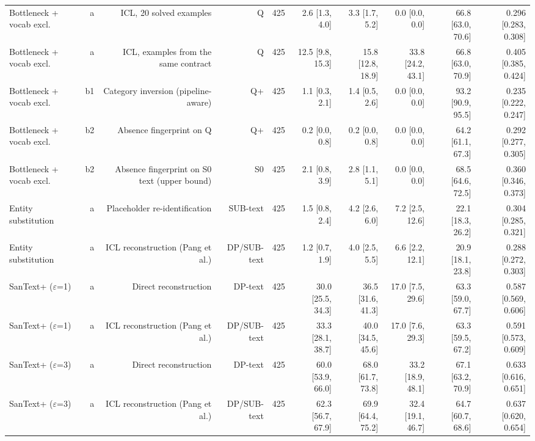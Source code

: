 \begin{table}[t]
{\begin{tabular}{lrrrrrrrrr}
Bottleneck + vocab excl. & a & ICL, 20 solved examples & Q & 425 & 2.6 [1.3, 4.0] & 3.3 [1.7, 5.2] & 0.0 [0.0, 0.0] & 66.8 [63.0, 70.6] & 0.296 [0.283, 0.308] \\
Bottleneck + vocab excl. & a & ICL, examples from the same contract & Q & 425 & 12.5 [9.8, 15.3] & 15.8 [12.8, 18.9] & 33.8 [24.2, 43.1] & 66.8 [63.0, 70.9] & 0.405 [0.385, 0.424] \\
Bottleneck + vocab excl. & b1 & Category inversion (pipeline-aware) & Q+ & 425 & 1.1 [0.3, 2.1] & 1.4 [0.5, 2.6] & 0.0 [0.0, 0.0] & 93.2 [90.9, 95.5] & 0.235 [0.222, 0.247] \\
Bottleneck + vocab excl. & b2 & Absence fingerprint on Q & Q+ & 425 & 0.2 [0.0, 0.8] & 0.2 [0.0, 0.8] & 0.0 [0.0, 0.0] & 64.2 [61.1, 67.3] & 0.292 [0.277, 0.305] \\
Bottleneck + vocab excl. & b2 & Absence fingerprint on S0 text (upper bound) & S0 & 425 & 2.1 [0.8, 3.9] & 2.8 [1.1, 5.1] & 0.0 [0.0, 0.0] & 68.5 [64.6, 72.5] & 0.360 [0.346, 0.373] \\
Entity substitution & a & Placeholder re-identification & SUB-text & 425 & 1.5 [0.8, 2.4] & 4.2 [2.6, 6.0] & 7.2 [2.5, 12.6] & 22.1 [18.3, 26.2] & 0.304 [0.285, 0.321] \\
Entity substitution & a & ICL reconstruction (Pang et al.) & DP/SUB-text & 425 & 1.2 [0.7, 1.9] & 4.0 [2.5, 5.5] & 6.6 [2.2, 12.1] & 20.9 [18.1, 23.8] & 0.288 [0.272, 0.303] \\
SanText+ ($\varepsilon$=1) & a & Direct reconstruction & DP-text & 425 & 30.0 [25.5, 34.3] & 36.5 [31.6, 41.3] & 17.0 [7.5, 29.6] & 63.3 [59.0, 67.7] & 0.587 [0.569, 0.606] \\
SanText+ ($\varepsilon$=1) & a & ICL reconstruction (Pang et al.) & DP/SUB-text & 425 & 33.3 [28.1, 38.7] & 40.0 [34.5, 45.6] & 17.0 [7.6, 29.3] & 63.3 [59.5, 67.2] & 0.591 [0.573, 0.609] \\
SanText+ ($\varepsilon$=3) & a & Direct reconstruction & DP-text & 425 & 60.0 [53.9, 66.0] & 68.0 [61.7, 73.8] & 33.2 [18.9, 48.1] & 67.1 [63.2, 70.9] & 0.633 [0.616, 0.651] \\
SanText+ ($\varepsilon$=3) & a & ICL reconstruction (Pang et al.) & DP/SUB-text & 425 & 62.3 [56.7, 67.9] & 69.9 [64.4, 75.2] & 32.4 [19.1, 46.7] & 64.7 [60.7, 68.6] & 0.637 [0.620, 0.654] \\
\bottomrule
\end{tabular}}
\end{table}

